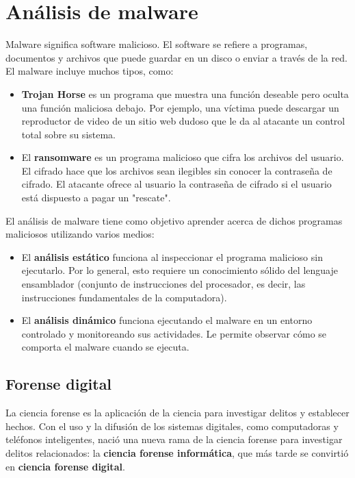 \section{Análisis de malware}
Malware significa software malicioso. El software se refiere a programas, documentos y archivos que puede guardar en un disco o enviar a través de la red. El malware incluye muchos tipos, como:
\begin{itemize}
Un \textbf{virus} es una pieza de código (parte de un programa) que se adjunta a un programa. Está diseñado para propagarse de una computadora a otra; además, funciona modificando, sobrescribiendo y eliminando archivos una vez que infecta una computadora. El resultado varía desde que la computadora se vuelve lenta hasta inutilizable.
\item \textbf{Trojan Horse} es un programa que muestra una función deseable pero oculta una función maliciosa debajo. Por ejemplo, una víctima puede descargar un reproductor de video de un sitio web dudoso que le da al atacante un control total sobre su sistema.
\item El \textbf{ransomware} es un programa malicioso que cifra los archivos del usuario. El cifrado hace que los archivos sean ilegibles sin conocer la contraseña de cifrado. El atacante ofrece al usuario la contraseña de cifrado si el usuario está dispuesto a pagar un "rescate".
\end{itemize}

El análisis de malware tiene como objetivo aprender acerca de dichos programas maliciosos utilizando varios medios:
\begin{itemize}
\item El \textbf{análisis estático} funciona al inspeccionar el programa malicioso sin ejecutarlo. Por lo general, esto requiere un conocimiento sólido del lenguaje ensamblador (conjunto de instrucciones del procesador, es decir, las instrucciones fundamentales de la computadora).
\item El \textbf{análisis dinámico} funciona ejecutando el malware en un entorno controlado y monitoreando sus actividades. Le permite observar cómo se comporta el malware cuando se ejecuta.\end{itemize}



\subsection{Forense digital}
La ciencia forense es la aplicación de la ciencia para investigar delitos y establecer hechos. Con el uso y la difusión de los sistemas digitales, como computadoras y teléfonos inteligentes, nació una nueva rama de la ciencia forense para investigar delitos relacionados: la \textbf{ciencia forense informática}, que más tarde se convirtió en \textbf{ciencia forense digital}.

